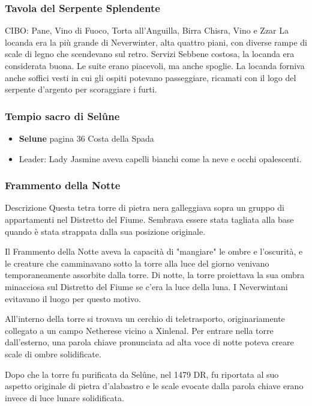 \documentclass{article}
\begin{document}
              \subsubsection{Tavola del Serpente Splendente}
CIBO: Pane, Vino di Fuoco, Torta all'Anguilla, Birra Chisra, Vino e Zzar\newline
La locanda era la più grande di Neverwinter, alta quattro piani, con diverse rampe di scale di legno che scendevano sul retro. Servizi Sebbene costosa, la locanda era considerata buona. Le suite erano piacevoli, ma anche spoglie. La locanda forniva anche soffici vesti in cui gli ospiti potevano passeggiare, ricamati con il logo del serpente d'argento per scoraggiare i furti.
              \subsubsection{Tempio sacro di Selûne}
\begin{itemize}
    \item \textbf{Selune} pagina 36 Costa della Spada
    \item Leader: Lady Jasmine aveva capelli bianchi come la neve e occhi opalescenti.
\end{itemize}
              \subsubsection{Frammento della Notte}
Descrizione\newline
Questa tetra torre di pietra nera galleggiava sopra un gruppo di appartamenti nel Distretto del Fiume. Sembrava essere stata tagliata alla base quando è stata strappata dalla sua posizione originale.

Il Frammento della Notte aveva la capacità di "mangiare" le ombre e l'oscurità, e le creature che camminavano sotto la torre alla luce del giorno venivano temporaneamente assorbite dalla torre. Di notte, la torre proiettava la sua ombra minacciosa sul Distretto del Fiume se c'era la luce della luna. I Neverwintani evitavano il luogo per questo motivo.

All'interno della torre si trovava un cerchio di teletrasporto, originariamente collegato a un campo Netherese vicino a Xinlenal. Per entrare nella torre dall'esterno, una parola chiave pronunciata ad alta voce di notte poteva creare scale di ombre solidificate.

Dopo che la torre fu purificata da Selûne, nel 1479 DR, fu riportata al suo aspetto originale di pietra d'alabastro e le scale evocate dalla parola chiave erano invece di luce lunare solidificata.
\end{document}

